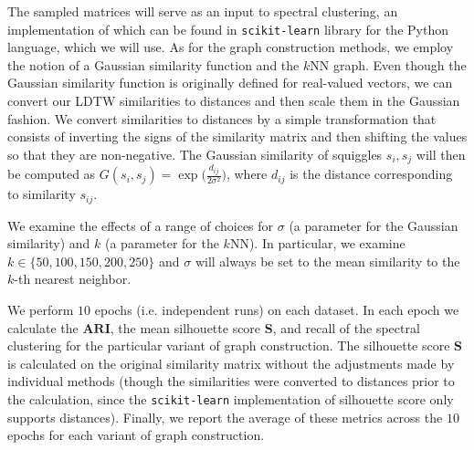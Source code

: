 The sampled matrices will serve as an input to spectral clustering, an implementation of which can be found in \texttt{scikit-learn} library \cite{scikit-learn} for the Python language, which we will use. As for the graph construction methods, we employ the notion of a Gaussian similarity function and the $k$NN graph. Even though the Gaussian similarity function is originally defined for real-valued vectors, we can convert our LDTW similarities to distances and then scale them in the Gaussian fashion. We convert similarities to distances by a simple transformation that consists of inverting the signs of the similarity matrix and then shifting the values so that they are non-negative. The Gaussian similarity of squiggles $s_i, s_j$ will then be computed as $G(s_i, s_j) = \exp \Big( \frac{d_{ij}}{2\sigma^2} \Big)$, where $d_{ij}$ is the distance corresponding to similarity $s_{ij}$.

We examine the effects of a range of choices for $\sigma$ (a parameter for the Gaussian similarity) and $k$ (a parameter for the $k$NN). In particular, we examine $k \in \{50, 100, 150, 200, 250\}$ and $\sigma$ will always be set to the mean similarity to the $k$-th nearest neighbor.

We perform $10$ epochs (i.e. independent runs) on each dataset. In each epoch we calculate the $\textbf{ARI}$, the mean silhouette score $\textbf{S}$, and recall of the spectral clustering for the particular variant of graph construction. The silhouette score $\textbf{S}$ is calculated on the original similarity matrix without the adjustments made by individual methods (though the similarities were converted to distances prior to the calculation, since the \texttt{scikit-learn} implementation of silhouette score only supports distances). Finally,  we report the average of these metrics across the $10$ epochs for each variant of graph construction.


